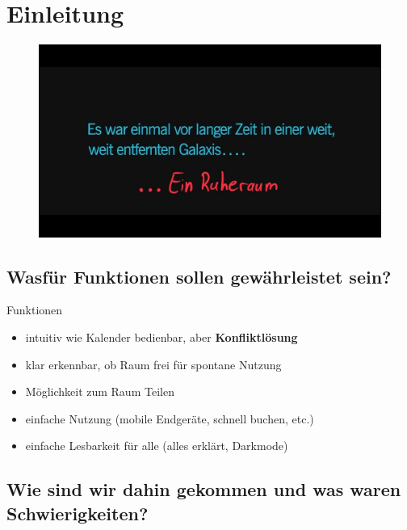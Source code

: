 \section{Einleitung}

\begin{frame}[plain]
    \thispagestyle{plain}
    \begin{figure}
        \centering
        \includegraphics[width=1\linewidth]{pictures/Galaxie}
        \label{fig:galaxie_weit_entfernt}
    \end{figure}
\end{frame}

\subsection[nötige Funktionen]{Wasfür Funktionen sollen gewährleistet sein?}

\begin{frame}{Funktionen}
    \begin{itemize}
        \item intuitiv wie Kalender bedienbar, aber \textrightarrow  \textbf{Konfliktlösung}
        \item klar erkennbar, ob Raum frei für spontane Nutzung
        \item Möglichkeit zum Raum Teilen
        \item einfache Nutzung (mobile Endgeräte, schnell buchen, etc.)
        \item einfache Lesbarkeit für alle (alles erklärt, Darkmode)
    \end{itemize}
\end{frame}

\subsection[Werdegang und Schwierigkeiten]{Wie sind wir dahin gekommen und was waren Schwierigkeiten?}

